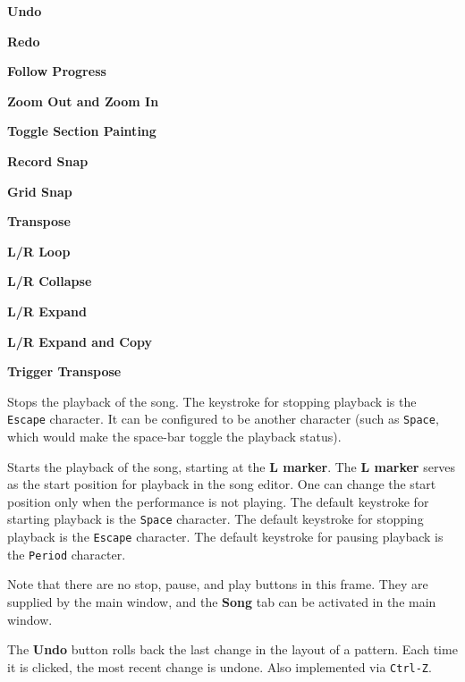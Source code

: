    \begin{enumber}
      \item \textbf{Undo}
      \item \textbf{Redo}
      \item \textbf{Follow Progress}
      \item \textbf{Zoom Out and Zoom In}
      \item \textbf{Toggle Section Painting}
      \item \textbf{Record Snap}
      \item \textbf{Grid Snap}
      \item \textbf{Transpose}
      \item \textbf{L/R Loop}
      \item \textbf{L/R Collapse}
      \item \textbf{L/R Expand}
      \item \textbf{L/R Expand and Copy}
      \item \textbf{Trigger Transpose}
   \end{enumber}

   \setcounter{ItemCounter}{0}      %

   Stops the playback of the song.
   The keystroke for stopping playback is the \texttt{Escape} character.
   It can be configured to be another character (such as \texttt{Space}, which
   would make the space-bar toggle the playback status).

   Starts the playback of the song, starting at the \textbf{L marker}.
   The \textbf{L marker} serves as the start position for playback
   in the song editor.  One can change the start position only when the
   performance is not playing.
   The default keystroke for starting playback is the \texttt{Space} character.
   The default keystroke for stopping playback is the \texttt{Escape} character.
   The default keystroke for pausing playback is the \texttt{Period} character.

   Note that there are no stop, pause, and play buttons in this frame.
   They are supplied by the main window, and the \textbf{Song} tab can be
   activated in the main window.

   The \textbf{Undo} button rolls back the last change in the layout of a
   pattern.  Each time it is clicked, the most recent change is undone.
   Also implemented via \texttt{Ctrl-Z}.

